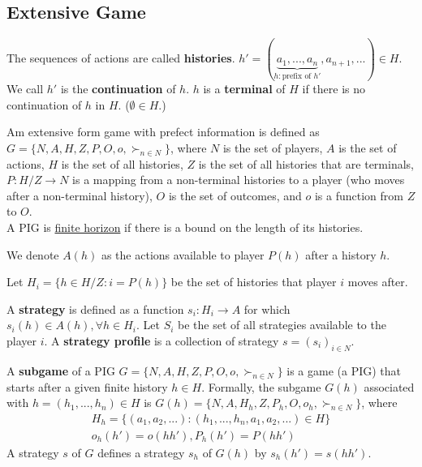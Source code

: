 \documentclass[11pt]{elegantbook_2}
\begin{document}
\subsection{Extensive Game}
\begin{definition}[History]
    The sequences of actions are called \textbf{histories}. $h'=(\underbrace{a_1,...,a_n}_{h: \text{prefix of }h'},a_{n+1},...)\in H$. We call $h'$ is the \textbf{continuation} of $h$. $h$ is a \textbf{terminal} of $H$ if there is no continuation of $h$ in $H$. ($\emptyset\in H$.)
\end{definition}

\begin{definition}
    Am extensive form game with prefect information is defined as $G=\{N,A,H,Z,P,O,o,\succ_{n\in N}\}$, where $N$ is the set of players, $A$ is the set of actions, $H$ is the set of all histories, $Z$ is the set of all histories that are terminals, $P:H/Z \rightarrow N$ is a mapping from a non-terminal histories to a player (who moves after a non-terminal history), $O$ is the set of outcomes, and $o$ is a function from $Z$ to $O$.\\
    A PIG is \underline{finite horizon} if there is a bound on the length of its histories.
\end{definition}


We denote $A(h)$ as the actions available to player $P(h)$ after a history $h$.

Let $H_i=\{h\in H/Z:i=P(h)\}$ be the set of histories that player $i$ moves after.

\begin{definition}[Strategy]
    A \textbf{strategy} is defined as a function $s_i:H_i \rightarrow A$ for which $s_i(h)\in A(h),\forall h\in H_i$. Let $S_i$ be the set of all strategies available to the player $i$. A \textbf{strategy profile} is a collection of strategy $s=(s_i)_{i\in N}$.
\end{definition}



\begin{definition}[Subgame]
    A \textbf{subgame} of a PIG $G=\{N,A,H,Z,P,O,o,\succ_{n\in N}\}$ is a game (a PIG) that starts after a given finite history $h\in H$. Formally, the subgame $G(h)$ associated with $h=(h_1,...,h_n)\in H$ is $G(h)=\{N,A,H_h,Z,P_h,O,o_h,\succ_{n\in N}\}$, where
    \begin{equation}
        \begin{aligned}
            H_h=\{(a_1,a_2,...):(h_1,...,h_n,a_1,a_2,...)\in H\}\\
            o_h(h')=o(hh'), P_h(h')=P(hh')
        \end{aligned}
        \nonumber
    \end{equation}
    A strategy $s$ of $G$ defines a strategy $s_h$ of $G(h)$ by $s_h(h')=s(hh')$.
\end{definition}
\end{document}
